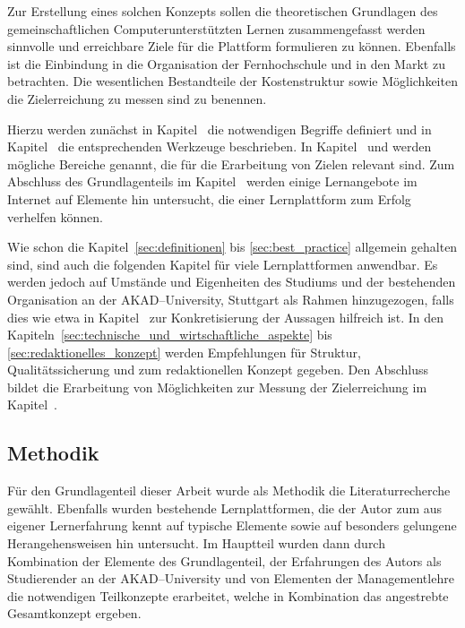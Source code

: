 Zur Erstellung eines solchen Konzepts sollen die theoretischen Grundlagen des gemeinschaftlichen Computerunterstützten Lernen zusammengefasst werden sinnvolle und erreichbare Ziele für die Plattform formulieren zu können. Ebenfalls ist die Einbindung in die Organisation der Fernhochschule und in den Markt zu betrachten. Die wesentlichen Bestandteile der Kostenstruktur sowie Möglichkeiten die Zielerreichung zu messen sind zu benennen.

Hierzu werden zunächst in Kapitel~ die notwendigen Begriffe definiert und in Kapitel~ die entsprechenden Werkzeuge beschrieben. In Kapitel~ und  werden mögliche Bereiche genannt, die für die Erarbeitung von Zielen relevant sind. Zum Abschluss des Grundlagenteils im Kapitel~ werden einige Lernangebote im Internet auf Elemente hin untersucht, die einer Lernplattform zum Erfolg verhelfen können.

Wie schon die Kapitel~\ref{sec:definitionen} bis \ref{sec:best_practice} allgemein gehalten sind, sind auch die folgenden Kapitel für viele Lernplattformen anwendbar. Es werden jedoch auf Umstände und Eigenheiten des Studiums und der bestehenden Organisation an der AKAD–University, Stuttgart als Rahmen hinzugezogen, falls dies wie etwa in Kapitel~ zur Konkretisierung der Aussagen hilfreich ist. In den Kapiteln~\ref{sec:technische_und_wirtschaftliche_aspekte} bis \ref{sec:redaktionelles_konzept} werden Empfehlungen für Struktur, Qualitätssicherung und zum redaktionellen Konzept gegeben. Den Abschluss bildet die Erarbeitung von Möglichkeiten zur Messung der Zielerreichung im Kapitel~.

\subsection{Methodik} %
\label{sub:methodik}
Für den Grundlagenteil dieser Arbeit wurde als Methodik die Literaturrecherche gewählt. Ebenfalls wurden bestehende Lernplattformen, die der Autor zum aus eigener Lernerfahrung kennt auf typische Elemente sowie auf besonders gelungene Herangehensweisen hin untersucht. Im Hauptteil wurden dann durch Kombination der Elemente des Grundlagenteil, der Erfahrungen des Autors als Studierender an der AKAD–University und von Elementen der Managementlehre die notwendigen Teilkonzepte erarbeitet, welche in Kombination das angestrebte Gesamtkonzept ergeben.

